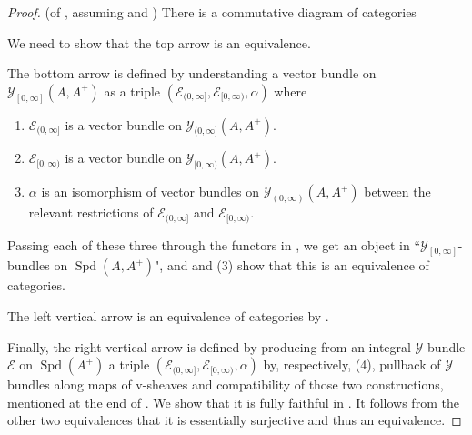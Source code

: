 \documentclass[10pt,twoside]{article}
\numberwithin{equation}{section}
\theoremstyle{plain}
\theoremstyle{definition}
\DeclareMathOperator{\Spec}{Spec}
\DeclareMathOperator{\Spd}{Spd}
\newcommand{\MCE}{\mathcal{E}}
\newcommand{\MCY}{\mathcal{Y}}
\DeclareMathOperator{\Inf}{inf}
\newcommand{\Ainf}{A_{\Inf}}
\newcommand{\Ycc}{\MCY_{[0,\infty]}}
\newcommand{\Yco}{\MCY_{[0,\infty)}}
\newcommand{\Yoc}{\MCY_{(0,\infty]}}
\newcommand{\Yoo}{\MCY_{(0,\infty)}}
\begin{document}
\begin{proof}(of , assuming  and )
There is a commutative diagram of categories

\begin{center}
\end{center}

We need to show that the top arrow is an equivalence.\par
The bottom arrow is defined by understanding a vector bundle on \(\Ycc(A,A^+)\) as a triple \((\MCE_{(0,\infty]},\MCE_{[0,\infty)},\alpha)\) where 
\begin{enumerate}
    \item \(\MCE_{(0,\infty]}\) is a vector bundle on \(\Yoc(A,A^+)\).
    \item \(\MCE_{[0,\infty)}\) is a vector bundle on \(\Yco(A,A^+)\).
    \item \(\alpha\) is an isomorphism of vector bundles on \(\Yoo(A,A^+)\) between the relevant restrictions of \(\MCE_{(0,\infty]}\) and \(\MCE_{[0,\infty)}\).
\end{enumerate}

Passing each of these three through the functors in , we get an object in ``\(\MCY_{[0,\infty]}\)-bundles on \(\Spd(A,A^+)\)", and  and  (3) show that this is an equivalence of categories.\par
The left vertical arrow is an equivalence of categories by .\par
Finally, the right vertical arrow is defined by producing from an integral \(\MCY\)-bundle \(\MCE\) on \(\Spd(A^+)\) a triple \((\MCE_{(0,\infty]},\MCE_{[0,\infty)},\alpha)\) by, respectively,  (4), pullback of \(\MCY\) bundles along maps of v-sheaves and compatibility of those two constructions, mentioned at the end of . We show that it is fully faithful in . It follows from the other two equivalences that it is essentially surjective and thus an equivalence.
\end{proof}
\end{document}
